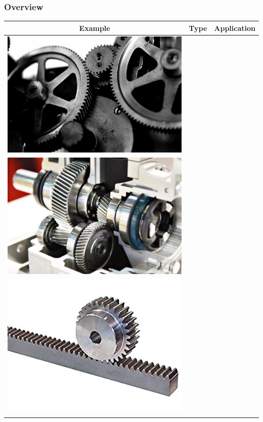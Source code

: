 \documentclass[fleqn]{beamer} %
\newcommand{\sectiontitleI}{Overview} %
\begin{document}
	\begin{frame}[label=sectionI] \small
		\frametitle{\sectiontitleI}	
		
		\begin{tabular}{|c|c|c|} 

			Example& Type& Application \\ \hline
			\includegraphics[scale=.07]{images/spur_gear.png}& & \\ \hline 
			\includegraphics[scale=.35]{images/helical_gear.png}& & \\ \hline
			\includegraphics[scale=.65]{images/rack_and_pinion2.png}& & \\ \hline
			& & \\
			




\end{tabular}
\end{frame}
\end{document}
